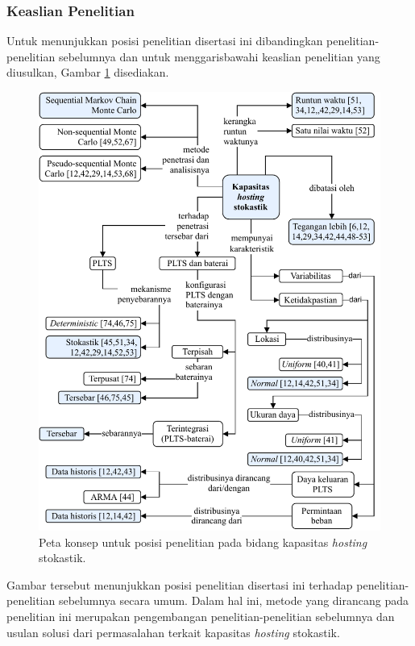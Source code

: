 {{{{{{\subsubsection{Keaslian Penelitian}
Untuk menunjukkan posisi penelitian disertasi ini dibandingkan penelitian-penelitian sebelumnya dan untuk menggarisbawahi keaslian penelitian yang diusulkan, Gambar \ref{cmap} disediakan.
\begin{figure}[!h]
	\centering
	\includegraphics[width=1\textwidth]{Fig/cmap}
	\caption{Peta konsep untuk posisi penelitian pada bidang kapasitas \textit{hosting} stokastik.}
	\label{cmap}
\end{figure}
Gambar tersebut menunjukkan posisi penelitian disertasi ini terhadap penelitian-penelitian sebelumnya secara umum. Dalam hal ini, metode yang dirancang pada penelitian ini merupakan pengembangan penelitian-penelitian sebelumnya dan usulan solusi dari permasalahan terkait kapasitas \textit{hosting} stokastik. %

}}}}}}
